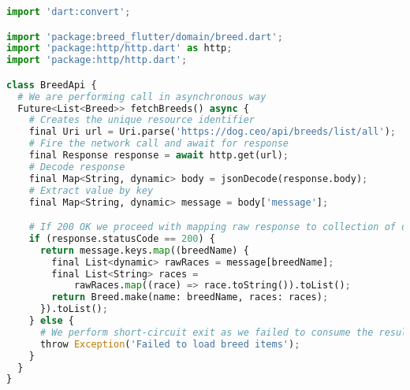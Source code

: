 \begin{lstlisting}[style=light, language=Python,label={lst:flutter_networking},caption=Flutter Networking]
import 'dart:convert';

import 'package:breed_flutter/domain/breed.dart';
import 'package:http/http.dart' as http;
import 'package:http/http.dart';

class BreedApi {
  # We are performing call in asynchronous way
  Future<List<Breed>> fetchBreeds() async {
    # Creates the unique resource identifier
    final Uri url = Uri.parse('https://dog.ceo/api/breeds/list/all');
    # Fire the network call and await for response
    final Response response = await http.get(url);
    # Decode response
    final Map<String, dynamic> body = jsonDecode(response.body);
    # Extract value by key
    final Map<String, dynamic> message = body['message'];

    # If 200 OK we proceed with mapping raw response to collection of domain types
    if (response.statusCode == 200) {
      return message.keys.map((breedName) {
        final List<dynamic> rawRaces = message[breedName];
        final List<String> races =
            rawRaces.map((race) => race.toString()).toList();
        return Breed.make(name: breedName, races: races);
      }).toList();
    } else {
      # We perform short-circuit exit as we failed to consume the result
      throw Exception('Failed to load breed items');
    }
  }
}
\end{lstlisting}

